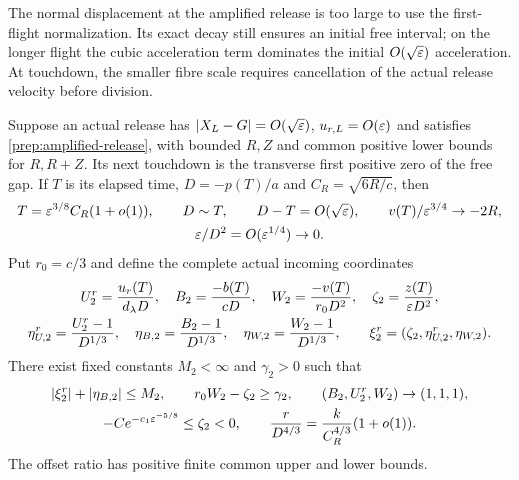 The normal displacement at the amplified release is too large to use
the first-flight normalization. Its exact decay still ensures an
initial free interval; on the longer flight the cubic acceleration
term dominates the initial $O(\sqrt{\varepsilon})$ acceleration. At touchdown,
the smaller fibre scale requires cancellation of the actual release
velocity before division.

\begin{lemma}
\label{lem:td2-complete-preparation}
Suppose an actual release has $|X_L-G|=O(\sqrt{\varepsilon})$,
$u_{r,L}=O(\varepsilon)$ and satisfies \eqref{prep:amplified-release},
with bounded $R,Z$ and common positive lower bounds for $R,R+Z$.
Its next touchdown is the transverse first positive zero of the free
gap. If $T$ is its elapsed time, $D=-p(T)/a$ and
$C_R=\sqrt{6R/c}$, then
\begin{gather}
 T=\varepsilon^{3/8}C_R(1+o(1)),\qquad D\sim T,\qquad
 D-T=O(\sqrt{\varepsilon}),\qquad v(T)/\varepsilon^{3/4}\to-2R,
 \label{prep:second-scale}\\
 \varepsilon/D^2=O(\varepsilon^{1/4})\to0.
\end{gather}
Put $r_0=c/3$ and define the complete actual incoming coordinates
\begin{gather}
 U_2^r=\frac{u_r(T)}{d_\lambda D},\quad B_2=\frac{-b(T)}{cD},\quad
 W_2=\frac{-v(T)}{r_0D^2},\quad
 \zeta_2=\frac{z(T)}{\varepsilon D^2},\\
 \eta_{U,2}^r=\frac{U_2^r-1}{D^{1/3}},\quad
 \eta_{B,2}=\frac{B_2-1}{D^{1/3}},\quad
 \eta_{W,2}=\frac{W_2-1}{D^{1/3}},\qquad
 \xi_2^r=(\zeta_2,\eta_{U,2}^r,\eta_{W,2}).
 \label{prep:second-coordinates}
\end{gather}
There exist fixed constants $M_2<\infty$ and $\gamma_2>0$ such that
\begin{gather}
 |\xi_2^r|+|\eta_{B,2}|\le M_2,\qquad
 r_0W_2-\zeta_2\ge\gamma_2,\qquad
 (B_2,U_2^r,W_2)\to(1,1,1),\\
 -Ce^{-c_1\varepsilon^{-5/8}}\le\zeta_2<0,\qquad
 \frac r{D^{4/3}}=\frac{k}{C_R^{4/3}}(1+o(1)).
 \label{prep:complete-second-cone}
\end{gather}
The offset ratio has positive finite common upper and lower bounds.
\end{lemma}
